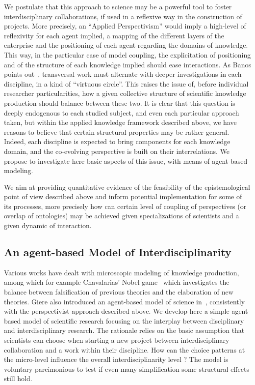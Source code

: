 We postulate that this approach to science may be a powerful tool to foster interdisciplinary collaborations, if used in a reflexive way in the construction of projects. More precisely, an ``Applied Perspectivism'' would imply a high-level of reflexivity for each agent implied, a mapping of the different layers of the enterprise and the positioning of each agent regarding the domains of knowledge. This way, in the particular case of model coupling, the explicitation of positioning and of the structure of each knowledge implied should ease interactions. As Banos points out~\cite{banos2013pour}, transversal work must alternate with deeper investigations in each discipline, in a kind of ``virtuous circle''. This raises the issue of, before individual researcher particularities, how a given collective structure of scientific knowledge production should balance between these two. It is clear that this question is deeply endogenous to each studied subject, and even each particular approach taken, but within the applied knowledge framework described above, we have reasons to believe that certain structural properties may be rather general. Indeed, each discipline is expected to bring components for each knowledge domain, and the co-evolving perspective is built on their interrelations. We propose to investigate here basic aspects of this issue, with means of agent-based modeling.


We aim at providing quantitative evidence of the feasibility of the epistemological point of view described above and inform potential implementation for some of its processes, more precisely how can certain level of coupling of perspectives (or overlap of ontologies) may be achieved given specializations of scientists and a given dynamic of interaction.



\subsection*{An agent-based Model of Interdisciplinarity}

Various works have dealt with microscopic modeling of knowledge production, among which for example Chavalarias' Nobel game~\cite{chavalarias2016s} which investigates the balance between falsification of previous theories and the elaboration of new theories. Giere also introduced an agent-based model of science in~\cite{giere2010agent}, consistently with the perspectivist approach described above. We develop here a simple agent-based model of scientific research focusing on the interplay between disciplinary and interdisciplinary research. The rationale relies on the basic assumption that scientists can choose when starting a new project between interdisciplinary collaboration and a work within their discipline. How can the choice patterns at the micro-level influence the overall interdisciplinarity level ? The model is voluntary parcimonious to test if even many simplification some structural effects still hold.


